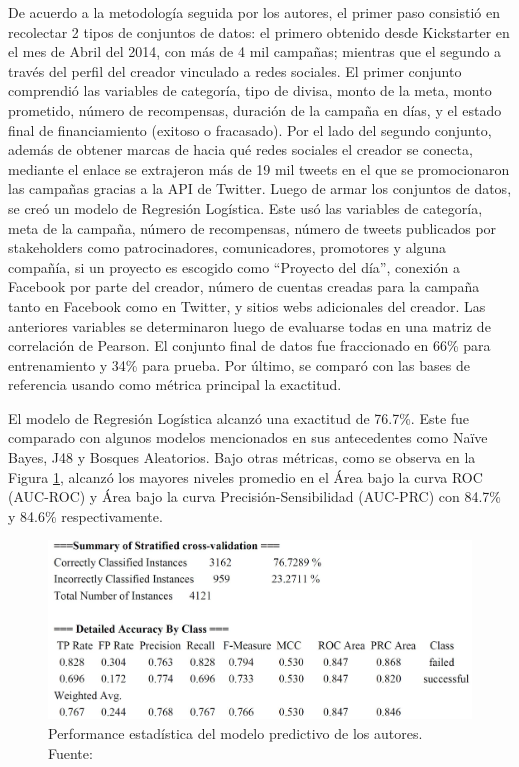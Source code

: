 De acuerdo a la metodología seguida por los autores, el primer paso consistió en recolectar 2 tipos de conjuntos de datos: el primero obtenido desde Kickstarter en el mes de Abril del 2014, con más de 4 mil campañas; mientras que el segundo a través del perfil del creador vinculado a redes sociales. El primer conjunto comprendió las variables de categoría, tipo de divisa, monto de la meta, monto prometido, número de recompensas, duración de la campaña en días, y el estado final de financiamiento (exitoso o fracasado). Por el lado del segundo conjunto, además de obtener marcas de hacia qué redes sociales el creador se conecta, mediante el enlace se extrajeron más de 19 mil tweets en el que se promocionaron las campañas gracias a la API de Twitter. Luego de armar los conjuntos de datos, se creó un modelo de Regresión Logística. Este usó las variables de categoría, meta de la campaña, número de recompensas, número de tweets publicados por stakeholders como patrocinadores, comunicadores, promotores y alguna compañía, si un proyecto es escogido como “Proyecto del día”, conexión a Facebook por parte del creador, número de cuentas creadas para la campaña tanto en Facebook como en Twitter, y sitios webs adicionales del creador. Las anteriores variables se determinaron luego de evaluarse todas en una matriz de correlación de Pearson. El conjunto final de datos fue fraccionado en 66\% para entrenamiento y 34\% para prueba. Por último, se comparó con las bases de referencia usando como métrica principal la exactitud.

El modelo de Regresión Logística alcanzó una exactitud de 76.7\%. Este fue comparado con algunos modelos mencionados en sus antecedentes como Naïve Bayes, J48 y Bosques Aleatorios. Bajo otras métricas, como se observa en la Figura \ref{2:fig120}, alcanzó los mayores niveles promedio en el Área bajo la curva ROC (AUC-ROC) y Área bajo la curva Precisión-Sensibilidad (AUC-PRC) con 84.7\% y 84.6\% respectivamente.

\begin{figure}[!ht]
	\begin{center}
		\includegraphics[width=1\textwidth]{2/figures/kaur2017.jpg}
		\caption[Performance estadística del modelo predictivo de los autores]{Performance estadística del modelo predictivo de los autores.\\
			Fuente: \cite{pr_kaur2017socmedcrowd}}
		\label{2:fig120}
	\end{center}
\end{figure}

